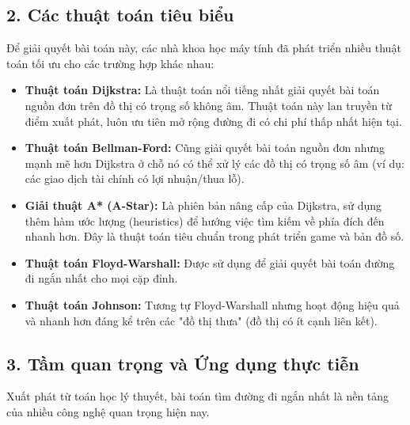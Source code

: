 \documentclass[12pt,a4paper,oneside]{report}
\begin{document}
\subsection*{2. Các thuật toán tiêu biểu}
Để giải quyết bài toán này, các nhà khoa học máy tính đã phát triển nhiều thuật toán tối ưu cho các trường hợp khác nhau:

\begin{itemize}
    \item \textbf{Thuật toán Dijkstra:} Là thuật toán nổi tiếng nhất giải quyết bài toán nguồn đơn trên đồ thị có trọng số không âm. Thuật toán này lan truyền từ điểm xuất phát, luôn ưu tiên mở rộng đường đi có chi phí thấp nhất hiện tại.
    \item \textbf{Thuật toán Bellman-Ford:} Cũng giải quyết bài toán nguồn đơn nhưng mạnh mẽ hơn Dijkstra ở chỗ nó có thể xử lý các đồ thị có trọng số âm (ví dụ: các giao dịch tài chính có lợi nhuận/thua lỗ).
    \item \textbf{Giải thuật A* (A-Star):} Là phiên bản nâng cấp của Dijkstra, sử dụng thêm hàm ước lượng (heuristics) để hướng việc tìm kiếm về phía đích đến nhanh hơn. Đây là thuật toán tiêu chuẩn trong phát triển game và bản đồ số.
    \item \textbf{Thuật toán Floyd-Warshall:} Được sử dụng để giải quyết bài toán đường đi ngắn nhất cho mọi cặp đỉnh.
    \item \textbf{Thuật toán Johnson:} Tương tự Floyd-Warshall nhưng hoạt động hiệu quả và nhanh hơn đáng kể trên các "đồ thị thưa" (đồ thị có ít cạnh liên kết).
\end{itemize}

\subsection*{3. Tầm quan trọng và Ứng dụng thực tiễn}
Xuất phát từ toán học lý thuyết, bài toán tìm đường đi ngắn nhất là nền tảng của nhiều công nghệ quan trọng hiện nay.
\end{document}
